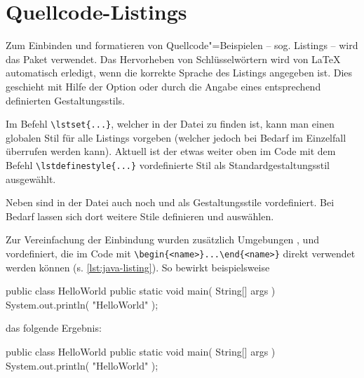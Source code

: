 \section{Quellcode-Listings}%
%
\label{sec:Listings}
%
Zum Einbinden und formatieren von Quellcode"=Beispielen
-- sog. Listings -- wird das Paket 
\parencite{Hoffmann2014} verwendet.
Das Hervorheben von Schlüsselwörtern
wird von LaTeX automatisch erledigt,
wenn die korrekte Sprache des Listings angegeben ist.
Dies geschieht mit Hilfe der Option 
oder durch die Angabe eines entsprechend definierten Gestaltungsstils.

Im Befehl \lstinline|\lstset{...}|,
welcher in der Datei  zu finden ist,
kann man einen globalen Stil für alle Listings vorgeben
(welcher jedoch bei Bedarf im Einzelfall überrufen werden kann).
Aktuell ist der etwas weiter oben im Code mit dem Befehl
\lstinline|\lstdefinestyle{...}| vordefinierte Stil
 als Standardgestaltungsstil ausgewählt.

Neben  sind in der Datei 
auch noch  und  als Gestaltungsstile vordefiniert.
Bei Bedarf lassen sich dort weitere Stile definieren und auswählen.

Zur Vereinfachung der Einbindung wurden zusätzlich Umgebungen
,  und 
vordefiniert, die im Code mit \lstinline|\begin{<name>}...\end{<name>}|
direkt verwendet werden können (s. \cref{lst:java-listing}).
%
So bewirkt beispielsweise
%
\begin{latex}[caption={Beispiel eines Listings in Java},label={lst:java-listing}]
\begin{java}[caption={A Java Hello-World example},%
             label={lst:hello-world}]
public class HelloWorld {
  public static void main( String[] args ) {
    System.out.println( "HelloWorld" );
  }
}
\end{java}
\end{latex}
%
das folgende Ergebnis:
%
\begin{C++}[caption={A Java Hello-World example},label={lst:hello-world}]
public class HelloWorld {
  public static void main( String[] args ) {
    System.out.println( "HelloWorld" );
  }
}
\end{C++}

